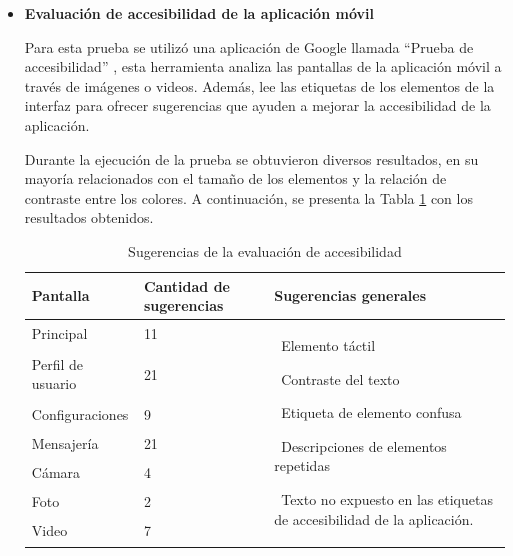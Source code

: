 \documentclass[lettersize,journal]{IEEEtran}
\begin{document}
\begin{itemize}
	\item \textbf{Evaluación de accesibilidad de la aplicación móvil} 
	
	Para esta prueba se utilizó una aplicación de Google llamada “Prueba de accesibilidad” \cite{Chen2022,AcostaVargas2021Accessibility}, esta herramienta analiza las pantallas de la aplicación móvil a través de imágenes o videos. Además, lee las etiquetas de los elementos de la interfaz para ofrecer sugerencias que ayuden a mejorar la accesibilidad de la aplicación. 
	
	Durante la ejecución de la prueba se obtuvieron diversos resultados, en su mayoría relacionados con el tamaño de los elementos y la relación de contraste entre los colores. A continuación, se presenta la Tabla \ref{tab:sugerencias-accesibilidad} con los resultados obtenidos.
	
	\begin{table}[H]
		\centering
		\caption{Sugerencias de la evaluación de accesibilidad}
		\label{tab:sugerencias-accesibilidad}
		
		\begin{tabular}{l|p{1.5cm}|p{4cm}}
			\toprule
			\textbf{Pantalla} & \textbf{Cantidad de sugerencias} & \textbf{Sugerencias generales} \\
			\midrule
			
			Principal & 11 &
			\multirow{7}{4.2cm}{
				\textbullet\ Elemento táctil\par
				\textbullet\ Contraste del texto\par
				\textbullet\ Etiqueta de elemento confusa\par
				\textbullet\ Descripciones de elementos repetidas\par
				\textbullet\ Texto no expuesto en las etiquetas de accesibilidad de la aplicación.
			} \\
			
			Perfil de usuario & 21 & \\
			
			Configuraciones & 9 & \\
			
			Mensajería & 21 & \\
			
			Cámara & 4 & \\
			
			Foto & 2 & \\
			
			Video & 7 & \\
			
			\bottomrule
		\end{tabular}
	\end{table}
	

\end{itemize}
\end{document}
